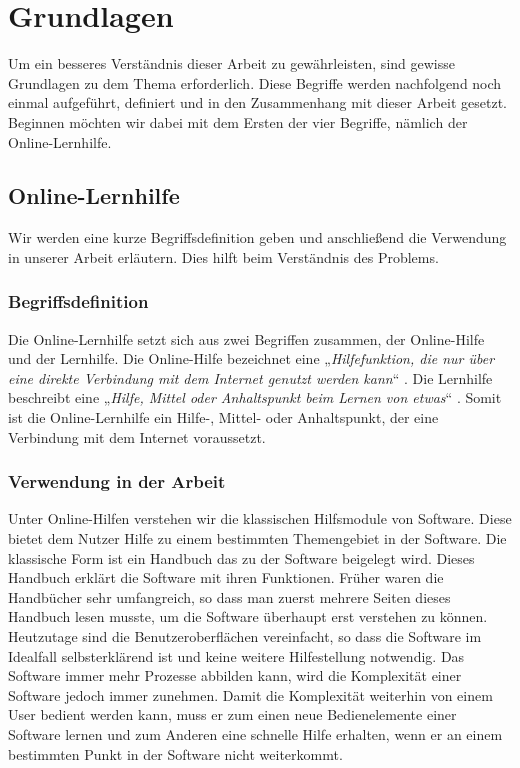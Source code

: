 \chapter{Grundlagen}
Um ein besseres Verständnis dieser Arbeit zu gewährleisten, sind gewisse Grundlagen zu dem Thema erforderlich. Diese Begriffe werden nachfolgend noch einmal aufgeführt, definiert und in den Zusammenhang mit dieser Arbeit gesetzt. Beginnen möchten wir dabei mit dem Ersten der vier Begriffe, nämlich der Online-Lernhilfe.



\section{Online-Lernhilfe}
Wir werden eine kurze Begriffsdefinition geben und anschließend die Verwendung in unserer Arbeit erläutern. Dies hilft beim Verständnis des Problems.
\subsection{Begriffsdefinition}
Die Online-Lernhilfe setzt sich aus zwei Begriffen zusammen, der Online-Hilfe und der Lernhilfe. Die Online-Hilfe bezeichnet eine „\textit{Hilfefunktion, die nur über eine direkte Verbindung mit dem Internet genutzt werden kann}“ \cite{onlinehilfe}. Die Lernhilfe beschreibt eine „\textit{Hilfe, Mittel oder Anhaltspunkt beim Lernen von etwas}“ \cite{lernhilfe}. Somit ist die Online-Lernhilfe ein Hilfe-, Mittel- oder Anhaltspunkt, der eine Verbindung mit dem Internet voraussetzt.

\subsection{Verwendung in der Arbeit}
Unter Online-Hilfen verstehen wir die klassischen Hilfsmodule von Software. Diese bietet dem Nutzer Hilfe zu einem bestimmten Themengebiet in der Software. Die klassische Form ist ein Handbuch das zu der Software beigelegt wird. Dieses Handbuch erklärt die Software mit ihren Funktionen. Früher waren die Handbücher sehr umfangreich, so dass man zuerst mehrere Seiten dieses Handbuch lesen musste, um die Software überhaupt erst verstehen zu können. Heutzutage sind die Benutzeroberflächen vereinfacht, so dass die Software im Idealfall selbsterklärend ist und keine weitere Hilfestellung notwendig. Das Software immer mehr Prozesse abbilden kann, wird die Komplexität einer Software jedoch immer zunehmen. Damit die Komplexität weiterhin von einem User bedient werden kann, muss er zum einen neue Bedienelemente einer Software lernen und zum Anderen eine schnelle Hilfe erhalten, wenn er an einem bestimmten Punkt in der Software nicht weiterkommt.

